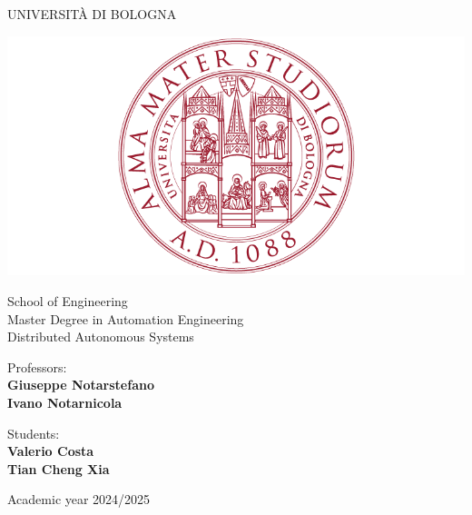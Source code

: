 \documentclass[a4paper,11pt,oneside]{book}
\begin{document}
\pagestyle{myheadings}

\def\R{{\mathbb{R}}}
\def\z{{\bm{z}}}
\def\Q{{\bm{Q}}}
\def\r{{\bm{r}}}
\def\p{{\bm{p}}}


\thispagestyle{empty}                                                 
\begin{center}                                                            
    \vspace{5mm}
    {\LARGE UNIVERSIT\`A DI BOLOGNA} \\                       
      \vspace{5mm}
\end{center}
\begin{center}
  \includegraphics[scale=.27]{figs/logo_unibo}
\end{center}
\begin{center}
      \vspace{5mm}
      {\LARGE School of Engineering} \\
        \vspace{3mm}
      {\Large Master Degree in Automation Engineering} \\
      \vspace{20mm}
      {\LARGE Distributed Autonomous Systems} \\
      \vspace{15mm}
\end{center}
\begin{minipage}{0.48\linewidth}
      \raggedright
     {\large Professors:}\\
     \textbf{Giuseppe Notarstefano} \\
     \textbf{Ivano Notarnicola} \\        
\end{minipage}
\begin{minipage}{0.48\linewidth}
      \raggedleft
      {\large Students:}\\
      \textbf{\@ Valerio Costa} \\
      \textbf{\@ Tian Cheng Xia} \\  
\end{minipage}
\begin{center}
\vfill
      {\large Academic year \@2024/2025} \\
\end{center}
\end{document}
